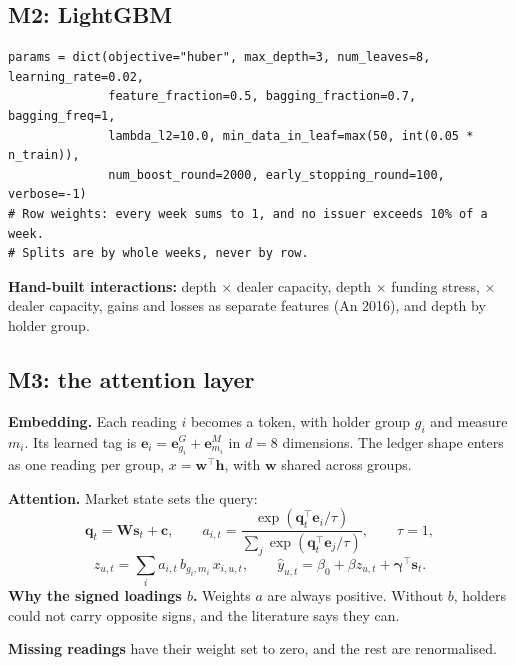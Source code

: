 \documentclass[11pt]{article}
\newcommand{\code}[1]{\texttt{\detokenize{#1}}}
\begin{document}
\subsection{M2: LightGBM}
\begin{lstlisting}
params = dict(objective="huber", max_depth=3, num_leaves=8, learning_rate=0.02,
              feature_fraction=0.5, bagging_fraction=0.7, bagging_freq=1,
              lambda_l2=10.0, min_data_in_leaf=max(50, int(0.05 * n_train)),
              num_boost_round=2000, early_stopping_round=100, verbose=-1)
# Row weights: every week sums to 1, and no issuer exceeds 10% of a week.
# Splits are by whole weeks, never by row.
\end{lstlisting}
\textbf{Hand-built interactions:} depth $\times$ dealer capacity, depth $\times$ funding stress, \code{cum_flow_4} $\times$ dealer capacity, gains and losses as separate features (An 2016), and depth by holder group.

\subsection{M3: the attention layer}
\textbf{Embedding.} Each reading $i$ becomes a token, with holder group $g_i$ and measure $m_i$. Its learned tag is $\mathbf{e}_i = \mathbf{e}^G_{g_i} + \mathbf{e}^M_{m_i}$ in $d = 8$ dimensions. The ledger shape enters as one reading per group, $x = \mathbf{w}^\top \mathbf{h}$, with $\mathbf{w}$ shared across groups.

\textbf{Attention.} Market state sets the query:
\[
\mathbf{q}_t = \mathbf{W}\mathbf{s}_t + \mathbf{c}, \qquad
a_{i,t} = \frac{\exp(\mathbf{q}_t^\top \mathbf{e}_i / \tau)}{\sum_j \exp(\mathbf{q}_t^\top \mathbf{e}_j / \tau)}, \qquad \tau = 1,
\]
\[
z_{u,t} = \sum_i a_{i,t}\, b_{g_i,m_i}\, x_{i,u,t}, \qquad
\hat{y}_{u,t} = \beta_0 + \beta z_{u,t} + \boldsymbol{\gamma}^\top \mathbf{s}_t .
\]
\textbf{Why the signed loadings $b$.} Weights $a$ are always positive. Without $b$, holders could not carry opposite signs, and the literature says they can.

\textbf{Missing readings} have their weight set to zero, and the rest are renormalised.
\end{document}
